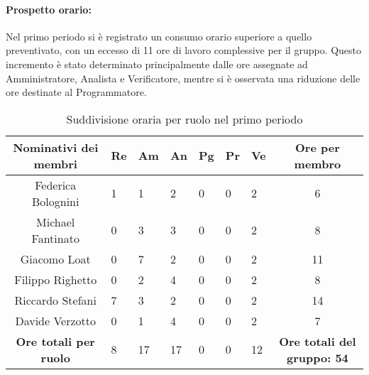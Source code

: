 \paragraph{Prospetto orario: }
Nel primo periodo si è registrato un consumo orario superiore a quello preventivato, con un eccesso di 11 ore di lavoro complessive per il gruppo. Questo incremento è stato determinato principalmente dalle ore assegnate ad Amministratore, Analista e Verificatore, mentre si è osservata una riduzione delle ore destinate al Programmatore.
\begin{table}[h!]
    \centering
    \renewcommand{\arraystretch}{1.5}
    \begin{tabularx}{\textwidth}{|c|X|X|X|X|X|X|c|}\hline
    \rowcolor[HTML]{FFD700} 
    \textbf{Nominativi dei membri} & \textbf{Re} & \textbf{Am} & \textbf{An} & \textbf{Pg} & \textbf{Pr} & \textbf{Ve} & \textbf{Ore per membro} \\ \hline
    Federica Bolognini & 1 & 1 & 2 & 0 & 0 & 2 & 6  \\ \hline
    Michael Fantinato  & 0 & 3 & 3 & 0 & 0 & 2 & 8  \\ \hline
    Giacomo Loat       & 0 & 7 & 2 & 0 & 0 & 2 & 11 \\ \hline
    Filippo Righetto   & 0 & 2 & 4 & 0 & 0 & 2 & 8  \\ \hline
    Riccardo Stefani   & 7 & 3 & 2 & 0 & 0 & 2 & 14 \\ \hline
    Davide Verzotto    & 0 & 1 & 4 & 0 & 0 & 2 & 7  \\ \hline
    \rowcolor[HTML]{FFD700} 
    \textbf{Ore totali per ruolo} & 8 & 17 & 17 & 0 & 0 & 12 & \textbf{Ore totali del gruppo: 54} \\ \hline
    \end{tabularx}
    \caption{Suddivisione oraria per ruolo nel primo periodo}
\end{table}

